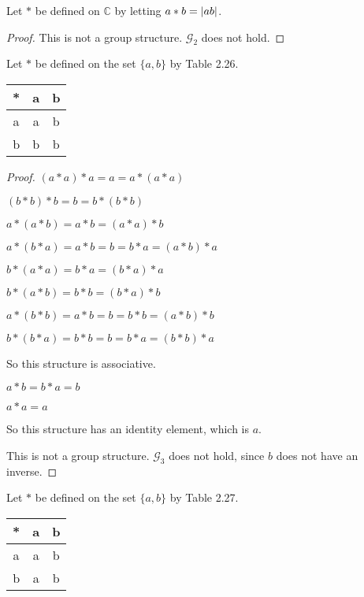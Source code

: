 \begin{exercise}
    Let $*$ be defined on $\mathbb{C}$ by letting $a * b = \left\vert{ab}\right\vert$.
\end{exercise}

\begin{proof}
    This is not a group structure. $\mathcal{G}_{2}$ does not hold.
\end{proof}

\begin{exercise}
    Let $*$ be defined on the set $\{ a, b \}$ by Table 2.26.
    \begin{tabular}{c|cc}
        * & a & b \\
        \hline
        a & a & b \\
        b & b & b
    \end{tabular}
\end{exercise}

\begin{proof}
    $(a * a) * a = a = a * (a * a)$

    $(b * b) * b = b = b * (b * b)$

    $a * (a * b) = a * b = (a * a) * b$

    $a * (b * a) = a * b = b = b * a = (a * b) * a$

    $b * (a * a) = b * a = (b * a) * a$

    $b * (a * b) = b * b = (b * a) * b$

    $a * (b * b) = a * b = b = b * b = (a * b) * b$

    $b * (b * a) = b * b = b = b * a = (b * b) * a$

    So this structure is associative.

    $a * b = b * a = b$

    $a * a = a$

    So this structure has an identity element, which is $a$.

    This is not a group structure. $\mathcal{G}_{3}$ does not hold, since $b$ does not have an inverse.
\end{proof}

\begin{exercise}
    Let $*$ be defined on the set $\{ a, b \}$ by Table 2.27.
    \begin{tabular}{c|cc}
        * & a & b \\
        \hline
        a & a & b \\
        b & a & b
    \end{tabular}
\end{exercise}

